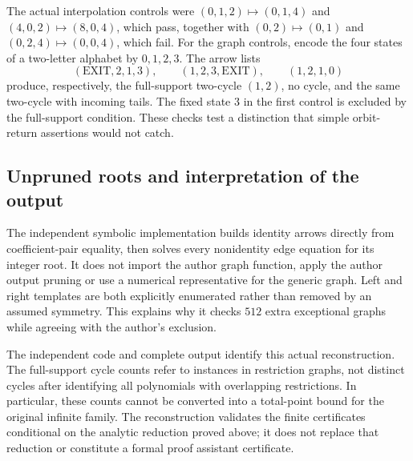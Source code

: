 The actual interpolation controls were $(0,1,2)\mapsto(0,1,4)$
and $(4,0,2)\mapsto(8,0,4)$, which pass, together with
$(0,2)\mapsto(0,1)$ and $(0,2,4)\mapsto(0,0,4)$, which fail.
For the graph controls, encode the four states of a two-letter
alphabet by $0,1,2,3$. The arrow lists
\[
 (\mathrm{EXIT},2,1,3),\qquad
 (1,2,3,\mathrm{EXIT}),\qquad (1,2,1,0)
\]
produce, respectively, the full-support two-cycle $(1,2)$, no
cycle, and the same two-cycle with incoming tails. The fixed state
$3$ in the first control is excluded by the full-support condition.
These checks test a distinction that simple orbit-return assertions
would not catch.

\subsection{Unpruned roots and interpretation of the output}
The independent symbolic implementation builds identity arrows
directly from coefficient-pair equality, then solves every
nonidentity edge equation for its integer root. It does not import
the author graph function, apply the author output pruning or use
a numerical representative for the generic graph. Left and right
templates are both explicitly enumerated rather than removed by
an assumed symmetry. This explains why it checks $512$ extra
exceptional graphs while agreeing with the author's exclusion.

The independent code and complete output identify this actual
reconstruction. The full-support cycle counts refer to instances
in restriction graphs, not distinct cycles after identifying all
polynomials with overlapping restrictions. In particular, these
counts cannot be converted into a total-point bound for the
original infinite family. The reconstruction validates the finite
certificates conditional on the analytic reduction proved above;
it does not replace that reduction or constitute a formal proof
assistant certificate.
